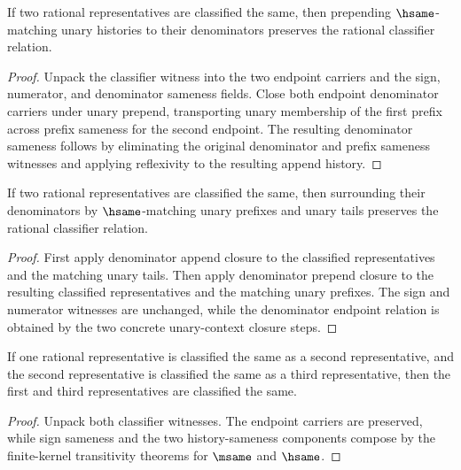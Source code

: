 \begin{theorem}
\label{thm:rat-classifier-prepend-unary-denominators-closed}
If two rational representatives are classified the same, then prepending
$\hsame$-matching unary histories to their denominators preserves the
rational classifier relation.
\end{theorem}
\begin{proof}
Unpack the classifier witness into the two endpoint carriers and the sign,
numerator, and denominator sameness fields. Close both endpoint denominator
carriers under unary prepend, transporting unary membership of the first prefix
across prefix sameness for the second endpoint. The resulting denominator
sameness follows by eliminating the original denominator and prefix sameness
witnesses and applying reflexivity to the resulting append history.
\end{proof}

\begin{theorem}
\label{thm:rat-classifier-append-unary-denominator-context-closed}
If two rational representatives are classified the same, then surrounding their
denominators by $\hsame$-matching unary prefixes and unary tails preserves the
rational classifier relation.
\end{theorem}
\begin{proof}
First apply denominator append closure to the classified representatives and
the matching unary tails. Then apply denominator prepend closure to the
resulting classified representatives and the matching unary prefixes. The sign
and numerator witnesses are unchanged, while the denominator endpoint relation
is obtained by the two concrete unary-context closure steps.
\end{proof}

\begin{theorem}
\label{thm:rat-classifier-transitivity}
If one rational representative is classified the same as a second representative, and the second representative is classified the same as a third representative, then the first and third representatives are classified the same.
\end{theorem}
\begin{proof}
Unpack both classifier witnesses. The endpoint carriers are preserved, while sign sameness and the two history-sameness components compose by the finite-kernel transitivity theorems for $\msame$ and $\hsame$.
\end{proof}

